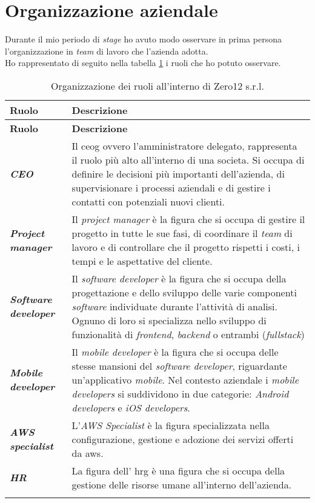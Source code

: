 \section{Organizzazione aziendale}
Durante il mio periodo di \textit{stage} ho avuto modo osservare in prima persona l'organizzazione in \textit{team} di lavoro che l'azienda adotta.\\
Ho rappresentato di seguito nella tabella \ref{tab:ruoli} i ruoli che ho potuto osservare.
\renewcommand{\arraystretch}{1.5}
\begin{longtable}{|p{3.5cm}|p{8.7cm}|}
    \hline
    \rowcolor{tableheader}\textbf{Ruolo} & \textbf{Descrizione} \\
    \hline
    \endfirsthead

    \rowcolor{tableheader}\textbf{Ruolo} & \textbf{Descrizione} \\
    \hline
    \endhead

    \hline
    \endfoot

    \hline
    \endlastfoot
    \hline
    \rowcolor{tableoddrow}\textbf{\textit{CEO}} & Il \gls{ceog} ovvero l'amministratore delegato, rappresenta il ruolo più alto all'interno di una societa. Si occupa di definire le decisioni più importanti dell'azienda, di supervisionare i processi aziendali e di gestire i contatti con potenziali nuovi clienti. \\
    \hline
    \rowcolor{tableevenrow}\textbf{\textit{Project manager}} & Il \textit{project manager} è la figura che si occupa di gestire il progetto in tutte le sue fasi, di coordinare il \textit{team} di lavoro e di controllare che il progetto rispetti i costi, i tempi e le aspettative del cliente.\\
    \hline
    \rowcolor{tableoddrow}\textbf{\textit{Software developer}} & Il \textit{software developer} è la figura che si occupa della progettazione e dello sviluppo delle varie componenti \textit{software} individuate durante l'attività di analisi. Ognuno di loro si specializza nello sviluppo di funzionalità di \textit{frontend}, \textit{backend} o entrambi (\textit{fullstack})\\
    \hline
    \rowcolor{tableevenrow}\textbf{\textit{Mobile developer}} & Il \textit{mobile developer} è la figura che si occupa delle stesse mansioni del \textit{software developer}, riguardante un'applicativo \textit{mobile}. Nel contesto aziendale i \textit{mobile developers} si suddividono in due categorie: \textit{Android developers} e \textit{iOS developers}.\\
    \hline
    \rowcolor{tableoddrow}\textbf{\textit{AWS specialist}} & L'\textit{AWS Specialist} è la figura specializzata nella configurazione, gestione e adozione dei servizi offerti da \gls{aws}.\\
    \hline
    \rowcolor{tableevenrow}\textbf{\textit{HR}} & La figura dell' \gls{hrg} è una figura che si occupa della gestione delle risorse umane all'interno dell'azienda.\\
    \hline
    \caption{Organizzazione dei ruoli all'interno di Zero12 s.r.l.}
    \label{tab:ruoli}
\end{longtable}

